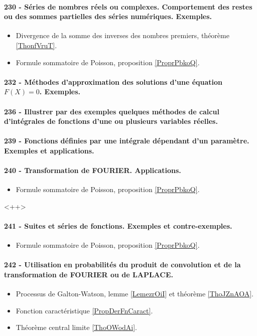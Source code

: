 \paragraph{230 - Séries de nombres réels ou complexes. Comportement des restes ou des sommes partielles des séries numériques. Exemples.}
\begin{itemize}
    \item Divergence de la somme des inverses des nombres premiers, théorème \ref{ThonfVruT}.
    \item Formule sommatoire de Poisson, proposition \ref{ProprPbkoQ}.
\end{itemize}
\paragraph{232 - Méthodes d’approximation des solutions d’une équation $F (X ) = 0$. Exemples.}
\paragraph{236 - Illustrer par des exemples quelques méthodes de calcul d’intégrales de fonctions d’une ou plusieurs variables réelles.}
\paragraph{239 - Fonctions définies par une intégrale dépendant d’un paramètre. Exemples et applications.}
\paragraph{240 - Transformation de FOURIER. Applications.}
\begin{itemize}
    \item Formule sommatoire de Poisson, proposition \ref{ProprPbkoQ}.
\end{itemize}
<++>
\paragraph{241 - Suites et séries de fonctions. Exemples et contre-exemples.}
\begin{itemize}
    \item Formule sommatoire de Poisson, proposition \ref{ProprPbkoQ}.
\end{itemize}
\paragraph{242 - Utilisation en probabilités du produit de convolution et de la transformation de FOURIER ou de LAPLACE.}
\begin{itemize}
    \item Processus de Galton-Watson, lemme \ref{LemezrOiI} et théorème \ref{ThoJZnAOA}.
    \item Fonction caractéristique \ref{PropDerFnCaract}.
    \item Théorème central limite \ref{ThoOWodAi}.
\end{itemize}

